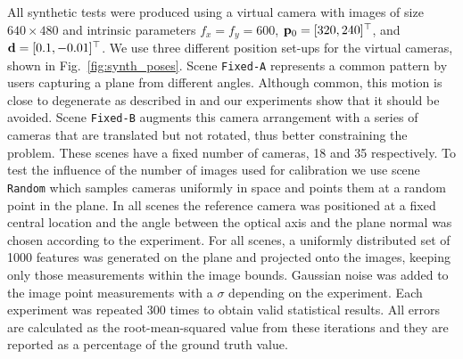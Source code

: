 \documentclass[10pt,twocolumn,letterpaper]{article}
\begin{document}
All synthetic tests were produced using a virtual camera with images of size $640 \times 480$ and intrinsic parameters $f_x=f_y=600$, $\mathbf{p}_0=[320,240]^\top$, and $\mathbf{d}=[0.1,-0.01]^\top$. We use three different position set-ups for the virtual cameras, shown in Fig.~\ref{fig:synth_poses}. Scene \texttt{Fixed-A} represents a common pattern by users capturing a plane from different angles. Although common, this motion is close to degenerate as described in \cite{sturm1997} and our experiments show that it should be avoided. Scene \texttt{Fixed-B} augments this camera arrangement with a series of cameras that are translated but not rotated, thus better constraining the problem. These scenes have a fixed number of cameras, 18 and 35 respectively. To test the influence of the number of images used for calibration we use scene \texttt{Random} which samples cameras uniformly in space and points them at a random point in the plane. In all scenes the reference camera was positioned at a fixed central location and the angle between the optical axis and the plane normal was chosen according to the experiment. For all scenes, a uniformly distributed set of 1000 features was generated on the plane and projected onto the images, keeping only those measurements within the image bounds. Gaussian noise was added to the image point measurements with a $\sigma$ depending on the experiment. Each experiment was repeated 300 times to obtain valid statistical results. All errors are calculated as the root-mean-squared value from these iterations and they are reported as a percentage of the ground truth value.
\end{document}
